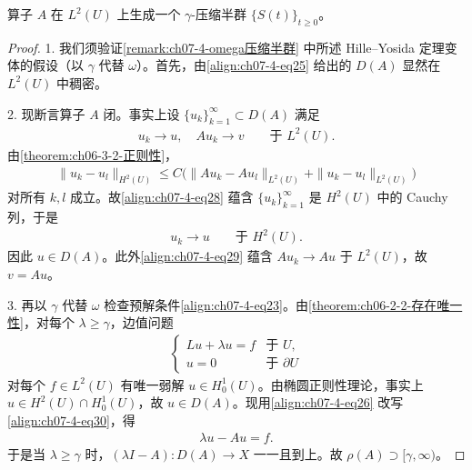 \documentclass[../../main.tex]{subfiles}
\begin{document}
\begin{theorem}\label{theorem:ch07-4-抛物型PDE作为半群}算子 $A$ 在 $L^2(U)$ 上生成一个 $\gamma$-压缩半群 $\{S(t)\}_{t\geqslant 0}$。
\end{theorem}

\begin{proof}
1. 我们须验证\cref{remark:ch07-4-omega压缩半群} 中所述 Hille--Yosida 定理变体的假设（以 $\gamma$ 代替 $\omega$）。首先，由\eqref{align:ch07-4-eq25} 给出的 $D(A)$ 显然在 $L^2(U)$ 中稠密。

2. 现断言算子 $A$ 闭。事实上设 $\{u_k\}_{k=1}^\infty\subset D(A)$ 满足
\begin{align}
u_k\to u,\quad Au_k\to v\qquad \text{于 } L^2(U).\label{align:ch07-4-eq28}
\end{align}
由\cref{theorem:ch06-3-2-正则性}，
\begin{align*}
\|u_k-u_l\|_{H^2(U)}\leqslant C\bigl(\|Au_k-Au_l\|_{L^2(U)}+\|u_k-u_l\|_{L^2(U)}\bigr)
\end{align*}
对所有 $k,l$ 成立。故\eqref{align:ch07-4-eq28} 蕴含 $\{u_k\}_{k=1}^\infty$ 是 $H^2(U)$ 中的 Cauchy 列，于是
\begin{align}
u_k\to u\qquad \text{于 } H^2(U).\label{align:ch07-4-eq29}
\end{align}
因此 $u\in D(A)$。此外\eqref{align:ch07-4-eq29} 蕴含 $Au_k\to Au$ 于 $L^2(U)$，故 $v=Au$。

3. 再以 $\gamma$ 代替 $\omega$ 检查预解条件\eqref{align:ch07-4-eq23}。由\cref{theorem:ch06-2-2-存在唯一性}，对每个 $\lambda\geqslant\gamma$，边值问题
\begin{align}
\begin{cases}
Lu+\lambda u=f & \text{于 } U,\\
u=0 & \text{于 } \partial U
\end{cases}\label{align:ch07-4-eq30}
\end{align}
对每个 $f\in L^2(U)$ 有唯一弱解 $u\in H^1_0(U)$。由椭圆正则性理论，事实上 $u\in H^2(U)\cap H^1_0(U)$，故 $u\in D(A)$。现用\eqref{align:ch07-4-eq26} 改写\eqref{align:ch07-4-eq30}，得
\begin{align}
\lambda u-Au=f.\label{align:ch07-4-eq31}
\end{align}
于是当 $\lambda\geqslant\gamma$ 时，$(\lambda I-A):D(A)\to X$ 一一且到上。故 $\rho(A)\supset[\gamma,\infty)$。


\end{proof}
\end{document}
